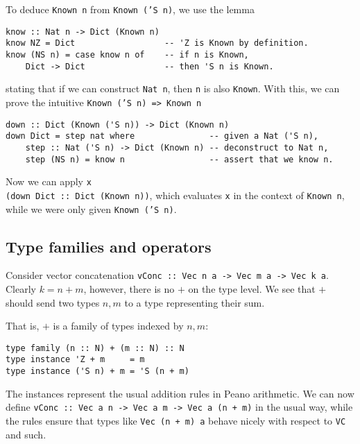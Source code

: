 \documentclass{article}
\begin{document}
    To deduce \texttt{Known n} from \texttt{Known ('S n)}, we use the lemma
\begin{verbatim}
know :: Nat n -> Dict (Known n)
know NZ = Dict                  -- 'Z is Known by definition.
know (NS n) = case know n of    -- if n is Known,
    Dict -> Dict                -- then 'S n is Known.
\end{verbatim}
    stating that if we can construct \texttt{Nat n}, then \texttt{n} is also \texttt{Known}.
    With this, we can prove the intuitive \texttt{Known ('S n) => Known n}
\begin{verbatim}
down :: Dict (Known ('S n)) -> Dict (Known n)
down Dict = step nat where               -- given a Nat ('S n),
    step :: Nat ('S n) -> Dict (Known n) -- deconstruct to Nat n,
    step (NS n) = know n                 -- assert that we know n.
\end{verbatim}
    Now we can apply \texttt{x \\ (down Dict :: Dict (Known n))}, which evaluates \texttt{x} in the context of \texttt{Known n},
    while we were only given \texttt{Known ('S n)}.

    \subsection{Type families and operators}
    Consider vector concatenation \texttt{vConc :: Vec n a -> Vec m a -> Vec k a}.
    Clearly $k = n + m$, however, there is no $+$ on the type level.
    We see that $+$ should send two types $n, m$ to a type representing their sum.

    That is, $+$ is a family of types indexed by $n, m$:
\begin{verbatim}
type family (n :: N) + (m :: N) :: N
type instance 'Z + m     = m
type instance ('S n) + m = 'S (n + m)
\end{verbatim}
    The instances represent the usual addition rules in Peano arithmetic.
    We can now define \texttt{vConc :: Vec a n -> Vec a m -> Vec a (n + m)} in the usual way, while the rules ensure that types like \texttt{Vec (n + m) a} behave nicely with respect to \texttt{VC} and such.
\end{document}
